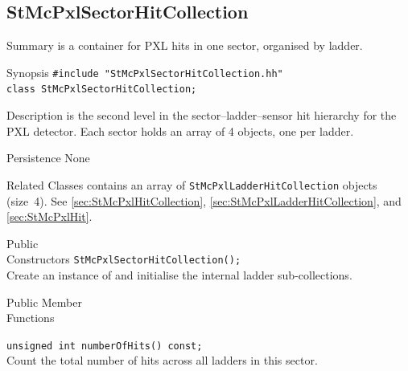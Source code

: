 \clearpage

%
%
\subsection{StMcPxlSectorHitCollection}
 
\label{sec:StMcPxlSectorHitCollection}
\begin{Entry}
\item[Summary]
     is a container for PXL hits in one
    sector, organised by ladder.

\item[Synopsis]
    \verb+#include "StMcPxlSectorHitCollection.hh"+\\
    \verb+class StMcPxlSectorHitCollection;+\\

\item[Description]
     is the second level in the
    sector--ladder--sensor hit hierarchy for the PXL detector.  Each
    sector holds an array of 4  objects,
    one per ladder.

\item[Persistence]
    None

\item[Related Classes]
     contains an array of
    {\tt StMcPxlLadderHitCollection} objects (size~4).  See
     \ref{sec:StMcPxlHitCollection},
     \ref{sec:StMcPxlLadderHitCollection},
    and  \ref{sec:StMcPxlHit}.

\item[Public\\ Constructors]
    \verb+StMcPxlSectorHitCollection();+\\
    Create an instance of  and
    initialise the internal ladder sub-collections.

\item[Public Member\\ Functions]

    \verb+unsigned int numberOfHits() const;+\\
    Count the total number of hits across all ladders in this sector.


\end{Entry}
